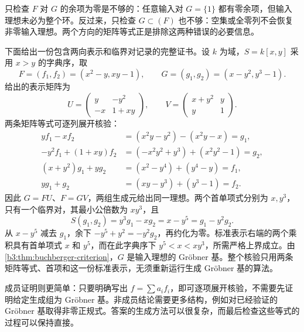 \begin{example}\label{b3:exm:B-complete-certificate}
	只检查 \(F\) 对 \(G\) 的余项为零是不够的：任意输入对 \(G=\{1\}\) 都有零余项，但输入理想未必为整个环。反过来，只检查 \(G\subset(F)\) 也不够：空集或全零列不会恢复非零输入理想。两个方向的矩阵等式正是排除这两种错误的必要信息。

	下面给出一份包含两向表示和临界对记录的完整证书。设 \(k\) 为域，\(S=k[x,y]\) 采用 \(x>y\) 的字典序，取
	\[
		F=(f_1,f_2)=(x^2-y,xy-1),\qquad G=(g_1,g_2)=(x-y^2,y^3-1).
	\]
	给出的表示矩阵为
	\[
		U=\begin{pmatrix}y&-y^2\\-x&1+xy\end{pmatrix},\qquad
		V=\begin{pmatrix}x+y^2&y\\y&1\end{pmatrix}.
	\]
	两条矩阵等式可逐列展开核验：
	\[
		\begin{aligned}
			yf_1-xf_2&=(x^2y-y^2)-(x^2y-x)=g_1,\\
			-y^2f_1+(1+xy)f_2&=(-x^2y^2+y^3)+(x^2y^2-1)=g_2,\\
			(x+y^2)g_1+yg_2&=(x^2-y^4)+(y^4-y)=f_1,\\
			yg_1+g_2&=(xy-y^3)+(y^3-1)=f_2.
		\end{aligned}
	\]
	因此 \(G=FU\)、\(F=GV\)，两组生成元给出同一理想。两个首单项式分别为 \(x,y^3\)，只有一个临界对，其最小公倍数为 \(xy^3\)，且
	\[
		S(g_1,g_2)=y^3g_1-xg_2=x-y^5=g_1-y^2g_2.
	\]
	从 \(x-y^5\) 减去 \(g_1\)，余下 \(-y^5+y^2=-y^2g_2\)，再约化为零。标准表示右端的两个乘积具有首单项式 \(x\) 和 \(y^5\)，而在此字典序下 \(y^5<x<xy^3\)，所需严格上界成立。由\cref{b3:thm:buchberger-criterion}，\(G\) 是输入理想的 Gröbner 基。整个核验只用两条矩阵等式、首项和这一份标准表示，无须重新运行生成 Gröbner 基的算法。
\end{example}

成员证明则更简单：只要明确写出 \(f=\sum a_if_i\)，即可逐项展开核验，不需要先证明给定生成组为 Gröbner 基。非成员结论需要更多结构，例如对已经验证的 Gröbner 基取得非零正规式。答案的生成方法可以很复杂，而最后检查这些等式的过程可以保持直接。
